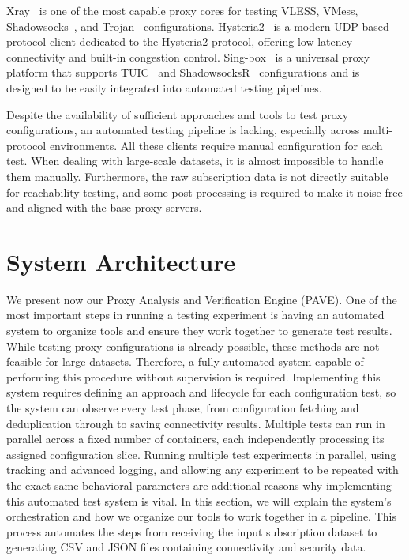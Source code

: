 \documentclass[10pt,conference]{IEEEtran}
\begin{document}
Xray~\cite{xray_core} is one of the most capable proxy cores for testing VLESS, VMess, Shadowsocks~\cite{shadowsocks_gfw}, and Trojan~\cite{trojan_gfw,trojanprobe2024} configurations.
Hysteria2~\cite{hysteria2_proto} is a modern UDP-based protocol client dedicated to the Hysteria2 protocol, offering low-latency connectivity and built-in congestion control.
Sing-box~\cite{singbox} is a universal proxy platform that supports TUIC~\cite{tuic} and ShadowsocksR~\cite{shadowsocksr} configurations and is designed to be easily integrated into automated testing pipelines.

Despite the availability of sufficient approaches and tools to test proxy configurations, an automated testing pipeline is lacking, especially across multi-protocol environments.
All these clients require manual configuration for each test.
When dealing with large-scale datasets, it is almost impossible to handle them manually.
Furthermore, the raw subscription data is not directly suitable for reachability testing, and some post-processing is required to make it noise-free and aligned with the base proxy servers.

\section{System Architecture}
We present now our Proxy Analysis and Verification Engine (PAVE).
One of the most important steps in running a testing experiment is having an automated system to organize tools and ensure they work together to generate test results.
While testing proxy configurations is already possible, these methods are not feasible for large datasets.
Therefore, a fully automated system capable of performing this procedure without supervision is required.
Implementing this system requires defining an approach and lifecycle for each configuration test, so the system can observe every test phase, from configuration fetching and deduplication through to saving connectivity results.
Multiple tests can run in parallel across a fixed number of containers, each independently processing its assigned configuration slice.
Running multiple test experiments in parallel, using tracking and advanced logging, and allowing any experiment to be repeated with the exact same behavioral parameters are additional reasons why implementing this automated test system is vital.
In this section, we will explain the system's orchestration and how we organize our tools to work together in a pipeline.
This process automates the steps from receiving the input subscription dataset to generating CSV and JSON files containing connectivity and security data.
\end{document}
